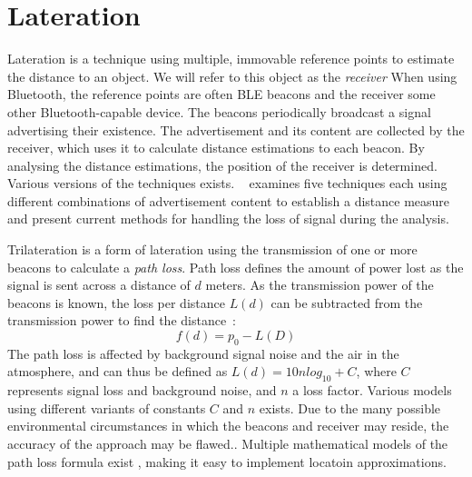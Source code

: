 \section{Lateration}
Lateration is a technique using multiple, immovable reference points to estimate the distance to an object\cite{presence_ble_review}.
We will refer to this object as the \textit{receiver}   
When using Bluetooth, the reference points are often BLE beacons and the receiver some other Bluetooth-capable device. 
The beacons periodically broadcast a signal advertising their existence. 
The advertisement and its content are collected by the receiver, which uses it to calculate distance estimations to each beacon. 
By analysing the distance estimations, the position of the receiver is determined.
Various versions of the techniques exists.
\citeauthor{presence_ble_review}~\cite{presence_ble_review} examines five techniques each using different combinations of advertisement content to establish a distance measure and present current methods for handling the loss of signal during the analysis.

Trilateration is a form of lateration using the transmission of one or more beacons to calculate a \textit{path loss}.
Path loss defines the amount of power lost as the signal is sent across a distance of $d$ meters.
As the transmission power of the beacons is known, the loss per distance $L(d)$ can be subtracted from the transmission power to find the distance~\cite{taking_localization_to_the_wild}:
\begin{equation}
    f(d) = p_0 - L(D)
\end{equation}
The path loss is affected by background signal noise and the air in the atmosphere, and can thus be defined as $L(d) = 10n log_{10}+C$, where $C$ represents signal loss and background noise, and $n$ a loss factor. \cite{presence_ble_review}
Various models using different variants of constants $C$ and $n$ exists\cite{path_loss_models}.
Due to the many possible environmental circumstances in which the beacons and receiver may reside, the accuracy of the approach may be flawed.\cite{presence_ble_review}. 
Multiple mathematical models of the path loss formula exist \cite{rssi_indoor_pos,positioning_alg_rssi,RSSI_ZigBee_distance}, making it easy to implement locatoin approximations.
